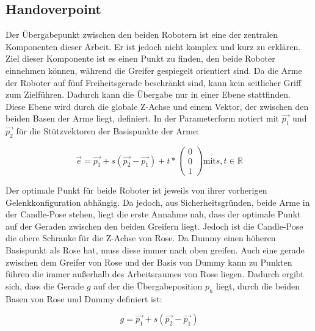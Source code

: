 \subsection{Handoverpoint}
\label{sec:impl-hop}
Der Übergabepunkt zwischen den beiden Robotern ist eine der zentralen Komponenten dieser Arbeit. Er ist jedoch nicht komplex und kurz zu erklären. Ziel dieser Komponente ist es einen Punkt zu finden, den beide Roboter einnehmen können, während die Greifer gespiegelt orientiert sind. Da die Arme der Roboter auf fünf Freiheitsgerade beschränkt sind, kann kein seitlicher Griff zum Zielführen. Dadurch kann die Übergabe nur in einer Ebene stattfinden. Diese Ebene wird durch die globale Z-Achse und einem Vektor, der zwischen den beiden Basen der Arme liegt, definiert. In der Parameterform notiert mit $\overrightarrow{p_1}$ und $\overrightarrow{p_2}$ für die Stützvektoren der Basispunkte der Arme:

\begin{equation}
\overrightarrow{e} = \overrightarrow{p_1} + s(\overrightarrow{p_2} - \overrightarrow{p_1}) + t*\left(\begin{array}{c} 0 \\ 0 \\ 1 \end{array}\right) \text{mit} s,t \in \mathbb{R}
\end{equation}

Der optimale Punkt für beide Roboter ist jeweils von ihrer vorherigen Gelenkkonfiguration abhängig. Da jedoch, aus Sicherheitsgründen, beide Arme in der Candle-Pose stehen, liegt die erste Annahme nah, dass der optimale Punkt auf der Geraden zwischen den beiden Greifern liegt. Jedoch ist die Candle-Pose die obere Schranke für die Z-Achse von Rose. Da Dummy einen höheren Basispunkt als Rose hat, muss diese immer nach oben greifen. Auch eine gerade zwischen dem Greifer von Rose und der Basis von Dummy kann zu Punkten führen die immer außerhalb des Arbeitsraumes von Rose liegen. Dadurch ergibt sich, dass die Gerade $g$ auf der die Übergabeposition $p_h$ liegt, durch die beiden Basen von Rose und Dummy definiert ist:

\begin{equation}
g = \overrightarrow{p_1} + s(\overrightarrow{p_2} - \overrightarrow{p_1})
\end{equation}


